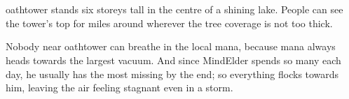\section{}
\label{oathtower}

\Gls{oathtower} stands six storeys tall in the centre of a shining lake.
People can see the tower's top for miles around wherever the tree coverage is not too thick.

Nobody near \gls{oathtower} can breathe in the local mana, because mana always heads towards the largest vacuum.
And since \gls{MindElder} spends so many  each day, he usually has the most missing by the end; so everything flocks towards him, leaving the air feeling stagnant even in a storm.


